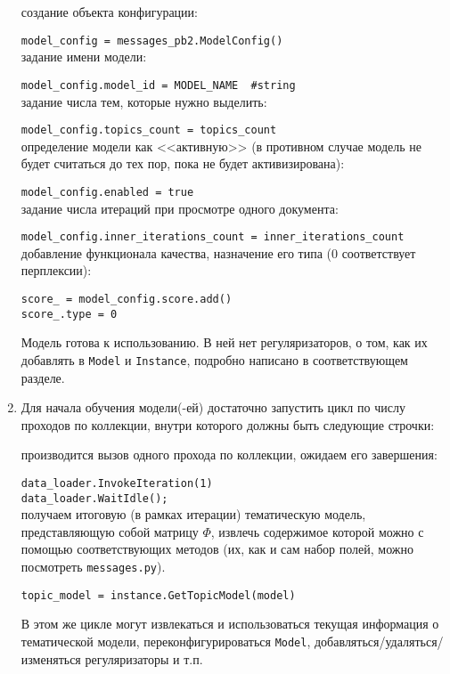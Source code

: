 \begin{enumerate}
	\vspace{5pt}	

	создание объекта конфигурации:

	\verb|model_config = messages_pb2.ModelConfig()| \\
	
	задание имени модели:
	
	\verb|model_config.model_id = MODEL_NAME  #string| \\
	
	задание числа тем, которые нужно выделить:
	
	\verb|model_config.topics_count = topics_count| \\

	определение модели как <<активную>> (в противном случае модель не будет считаться до тех пор, пока не будет активизирована):

	\verb|model_config.enabled = true| \\
	
	задание числа итераций при просмотре одного документа:	
	
	\verb|model_config.inner_iterations_count = inner_iterations_count| \\
	
	добавление функционала качества, назначение его типа (0 соответствует перплексии):	
	
	\verb|score_ = model_config.score.add()| \\
	\verb|score_.type = 0|
	
	Модель готова к использованию. В ней нет регуляризаторов, о том, как их добавлять в \verb'Model' и \verb'Instance', подробно написано в соответствующем разделе.
	
	\item Для начала обучения модели(-ей) достаточно запустить цикл по числу проходов по коллекции, внутри которого должны быть следующие строчки: 
	
	\vspace{5pt}	
	
	производится вызов одного прохода по коллекции, ожидаем его завершения:	
	
	\verb|data_loader.InvokeIteration(1)| \\	
	\verb|data_loader.WaitIdle();| \\
    
    получаем итоговую (в рамках итерации) тематическую модель, представляющую собой матрицу $\Phi$, извлечь содержимое которой можно с помощью соответствующих методов (их, как и сам набор полей, можно посмотреть \verb'messages.py').
	
	\verb|topic_model = instance.GetTopicModel(model)|
	    
	В этом же цикле могут извлекаться и использоваться текущая информация о тематической модели, переконфигурироваться \verb'Model', добавляться/удаляться/изменяться регуляризаторы и т.п.
\end{enumerate}

